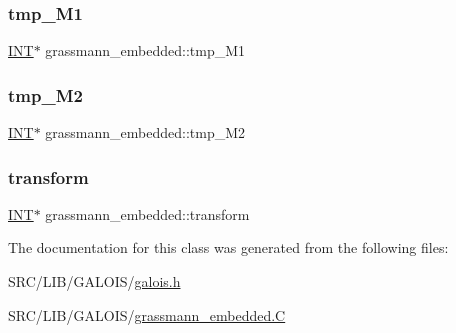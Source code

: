 \subsubsection{\texorpdfstring{tmp\+\_\+\+M1}{tmp\_M1}}
{\footnotesize\ttfamily \mbox{\hyperlink{galois_8h_a09fddde158a3a20bd2dcadb609de11dc}{I\+NT}}$\ast$ grassmann\+\_\+embedded\+::tmp\+\_\+\+M1}

\mbox{\label{classgrassmann__embedded_ad28ba8e895257e4f8d7dfa9c0cc80932}} 
\subsubsection{\texorpdfstring{tmp\+\_\+\+M2}{tmp\_M2}}
{\footnotesize\ttfamily \mbox{\hyperlink{galois_8h_a09fddde158a3a20bd2dcadb609de11dc}{I\+NT}}$\ast$ grassmann\+\_\+embedded\+::tmp\+\_\+\+M2}

\mbox{\label{classgrassmann__embedded_a7b2d9b45c4ab15bf67f70c29b663c96a}} 
\subsubsection{\texorpdfstring{transform}{transform}}
{\footnotesize\ttfamily \mbox{\hyperlink{galois_8h_a09fddde158a3a20bd2dcadb609de11dc}{I\+NT}}$\ast$ grassmann\+\_\+embedded\+::transform}



The documentation for this class was generated from the following files\+:\begin{DoxyCompactItemize}
\item 
S\+R\+C/\+L\+I\+B/\+G\+A\+L\+O\+I\+S/\mbox{\hyperlink{galois_8h}{galois.\+h}}\item 
S\+R\+C/\+L\+I\+B/\+G\+A\+L\+O\+I\+S/\mbox{\hyperlink{grassmann__embedded_8_c}{grassmann\+\_\+embedded.\+C}}\end{DoxyCompactItemize}
